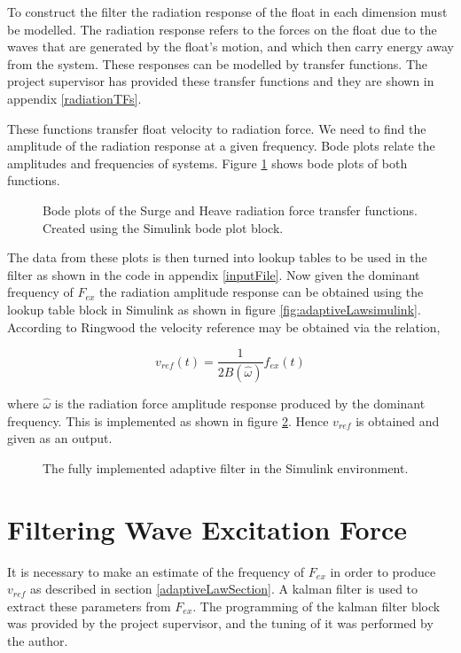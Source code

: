\documentclass{report}
\begin{document}
To construct the filter the radiation response of the float in each dimension must be modelled. The radiation response refers to the forces on the float due to the waves that are generated by the float's motion, and which then carry energy away from the system. These responses can be modelled by transfer functions. The project supervisor has provided these transfer functions and they are shown in appendix \ref{radiationTFs}.

These functions transfer float velocity to radiation force. We need to find the amplitude of the radiation response at a given frequency. Bode plots relate the amplitudes and frequencies of systems. Figure \ref{bodePlots} shows bode plots of both functions.

\begin{figure}
\label{bodePlots}
\caption{Bode plots of the Surge and Heave radiation force transfer functions. Created using the Simulink bode plot block.}
\end{figure} 

The data from these plots is then turned into lookup tables to be used in the filter as shown in the code in appendix \ref{inputFile}. Now given the dominant frequency of $F_{ex}$ the radiation amplitude response can be obtained using the lookup table block in Simulink as shown in figure \ref{fig:adaptiveLawsimulink}. According to Ringwood\cite{ringwood} the velocity reference may be obtained via the relation,

\[
v_{ref}(t)=\frac{1}{2B(\hat{\omega})}f_{ex}(t)
\]

where $\hat{\omega}$ is the radiation force amplitude response produced by the dominant frequency. This is implemented as shown in figure \ref{adaptiveLawSimulink}. Hence $v_{ref}$ is obtained and given as an output.
 
\begin{figure}
\label{adaptiveLawSimulink}
\caption{The fully implemented adaptive filter in the Simulink environment.}
\end{figure} 


\section{Filtering Wave Excitation Force}
\label{EKF}
It is necessary to make an estimate of the frequency of $F_{ex}$ in order to produce $v_{ref}$ as described in section 
\ref{adaptiveLawSection}. A kalman filter is used to extract these parameters from $F_{ex}$. The programming of the kalman filter block was provided by the project supervisor, and the tuning of it was performed by the author.
\end{document}
